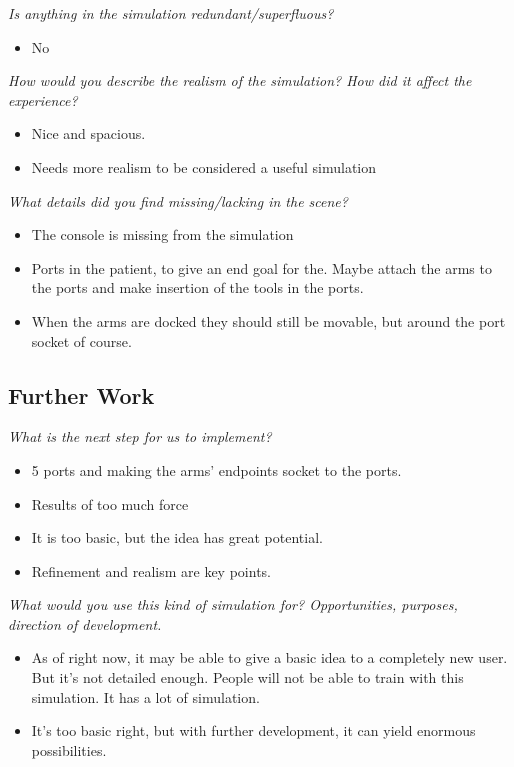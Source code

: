 \textit{Is anything in the simulation redundant/superfluous?}
\begin{itemize}
	\item No
\end{itemize}

\textit{How would you describe the realism of the simulation? How did it affect the experience?}
\begin{itemize}
	\item Nice and spacious.
	\item Needs more realism to be considered a useful simulation
\end{itemize}

\textit{What details did you find missing/lacking in the scene?}
\begin{itemize}
	\item The console is missing from the simulation
	\item Ports in the patient, to give an end goal for the. Maybe attach the arms to the ports and make insertion of the tools in the ports.
	\item When the arms are docked they should still be movable, but around the port socket of course.
\end{itemize}

\subsection{Further Work}
\textit{What is the next step for us to implement?}
\begin{itemize}
	\item 5 ports and making the arms’ endpoints socket to the ports. 
	\item Results of too much force
	\item It is too basic, but the idea has great potential.
	\item Refinement and realism are key points.
\end{itemize}

\textit{What would you use this kind of simulation for? Opportunities, purposes, direction of development.}
\begin{itemize}
	\item As of right now, it may be able to give a basic idea to a completely new user. But it’s not detailed enough. People will not be able to train with this simulation. It has a lot of simulation.
	\item It’s too basic right, but with further development, it can yield enormous possibilities. 
\end{itemize}

